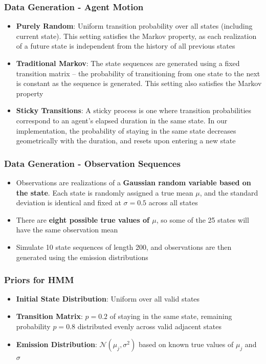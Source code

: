 \documentclass{beamer}
\begin{document}
\begin{frame}
    \frametitle{Data Generation - Agent Motion}
    \begin{itemize}
    \item \textbf{Purely Random}: Uniform transition probability over all states (including current state). This setting satisfies the Markov property, as each realization of a future state is independent from the history of all previous states
    \item \textbf{Traditional Markov}: The state sequences are generated using a fixed transition matrix -- the probability of transitioning from one state to the next is constant as the sequence is generated. This setting also satisfies the Markov property
    \item \textbf{Sticky Transitions}: A sticky process is one where transition probabilities correspond to an agent's elapsed duration in the same state. In our implementation, the probability of staying in the same state decreases geometrically with the duration, and resets upon entering a new state
    \end{itemize}
\end{frame}

\begin{frame}
    \frametitle{Data Generation - Observation Sequences}
    \begin{itemize}
        \item Observations are realizations of a \textbf{Gaussian random variable based on the state}. Each state is randomly assigned a true mean $\mu$, and the standard deviation is identical and fixed at $\sigma = 0.5$ across all states
        \item There are \textbf{eight possible true values of $\mu$}, so some of the 25 states will have the same observation mean
        \item Simulate 10 state sequences of length 200, and observations are then generated using the emission distributions
    \end{itemize}
\end{frame}

\begin{frame}
	\frametitle{Priors for HMM}
	\begin{itemize}
		\item \textbf{Initial State Distribution}: Uniform over all valid states
		\item \textbf{Transition Matrix}: $p = 0.2$ of staying in the same state, remaining probability $p = 0.8$ distributed evenly across valid adjacent states
		\item \textbf{Emission Distribution}: $\mathcal{N}(\mu_j, \sigma^2)$ based on known true values of $\mu_j$ and $\sigma$
	\end{itemize}
\end{frame}
\end{document}
